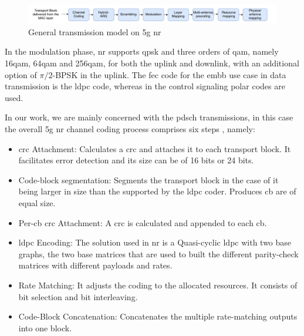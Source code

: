 \begin{figure}[htbp]
\includegraphics[width=\columnwidth]{figures/chp_theory/transmissionmodel.pdf}
\caption{General transmission model on \gls{5g} \gls{nr}}
\label{fig:transmission}
\end{figure}
%
In the modulation phase, \gls{nr} supports \gls{qpsk} and three orders of \gls{qam}, namely 16\gls{qam}, 64\gls{qam} and 256\gls{qam}, for both the uplink and downlink, with an additional option of $\pi/2$-BPSK in the uplink.
%
The \gls{fec} code for the \gls{embb} use case in data transmission is the \gls{ldpc} code, whereas in the control signaling polar codes are used.
%

In our work, we are mainly concerned with the \gls{pdsch} transmissions, in this case the overall \gls{5g} \gls{nr} channel coding process comprises six steps \cite{ErikDahlman5G}, namely:
\begin{itemize}
	\item \Gls{crc} Attachment: Calculates a \gls{crc} and attaches it to each transport block. It facilitates error detection and its size can be of 16 bits or 24 bits.
	\item Code-block segmentation: Segments the transport block in the case of it being larger in size than the supported by the \gls{ldpc} coder. Produces \gls{cb} are of equal size.
	\item Per-\gls{cb} \gls{crc} Attachment: A \gls{crc} is calculated and appended to each \gls{cb}.
	\item \gls{ldpc} Encoding: The solution used in \gls{nr} is a Quasi-cyclic \gls{ldpc} with two base graphs, the two base matrices that are used to built the different parity-check matrices with different payloads and rates.
	\item Rate Matching: It adjusts the coding to the allocated resources. It consists of bit selection and bit interleaving.
	\item Code-Block Concatenation: Concatenates the multiple rate-matching outputs into one block.
\end{itemize}

